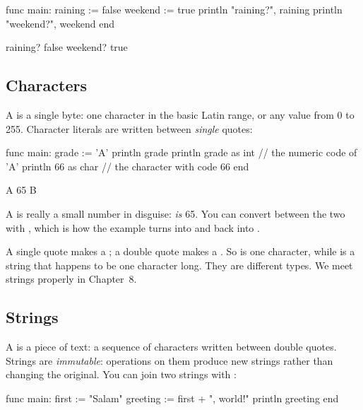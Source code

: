 \begin{salamen}
func main:
    raining := false
    weekend := true
    println "raining?", raining
    println "weekend?", weekend
end
\end{salamen}

\begin{progout}
raining? false
weekend? true
\end{progout}

\subsection{Characters}

A  is a single byte: one character in the basic Latin range, or any
value from 0 to 255. Character literals are written between \emph{single} quotes:

\begin{salamen}
func main:
    grade := 'A'
    println grade
    println grade as int        // the numeric code of 'A'
    println 66 as char          // the character with code 66
end
\end{salamen}

\begin{progout}
A
65
B
\end{progout}

A  is really a small number in disguise:  \emph{is} 65. You
can convert between the two with , which is how the example turns
 into  and  back into .

\begin{note}
A single quote makes a ; a double quote makes a . So
 is one character, while  is a string that happens to be one %
character long. They are different types. We meet strings properly in
Chapter~8.
\end{note}

\subsection{Strings}

A  is a piece of text: a sequence of characters written between
double quotes. Strings are \emph{immutable}: operations on them produce new
strings rather than changing the original. You can join two strings with
\code{+}:

\begin{salamen}
func main:
    first := "Salam"
    greeting := first + ", world!"
    println greeting
end
\end{salamen}

